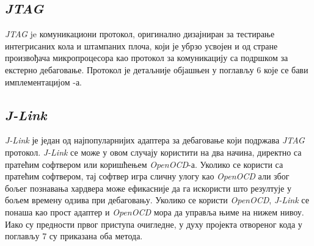 \subsection{\textit{\acrshort{JTAG}}}

\textit{\acrfull{JTAG}} \cite{jtag_spec} je комуникациони протокол, оригинално дизајниран за тестирање интегрисаних кола и штампаних плоча, који је убрзо усвојен и од стране произвођача микропроцесора као протокол за комуникацију са подршком за екстерно дебаговање. Протокол је детаљније објашњен у поглављу 6 које се бави имплементацијом -а.

\subsection{\textit{J-Link}}

\textit{J-Link} \cite{jlink} је један од најпопуларнијих адаптера за дебаговање који подржава \textit{\acrshort{JTAG}} протокол.
\textit{J-Link} се може у овом случају користити на два начина, директно са пратећим софтвером или коришћењем \textit{Open\acrshort{OCD}}-а. Уколико се користи са пратећим софтвером, тај софтвер игра сличну улогу као \textit{Open\acrshort{OCD}} али због бољег познавања хардвера може ефикасније да га искористи што резултује у бољем времену одзива при дебаговању. Уколико се користи \textit{Open\acrshort{OCD}}, \textit{J-Link} се понаша као прост адаптер и \textit{Open\acrshort{OCD}} мора да управља њиме на нижем нивоу. Иако су предности првог приступа очигледне, у духу пројекта отвореног кода у поглављу 7 су приказана оба метода.